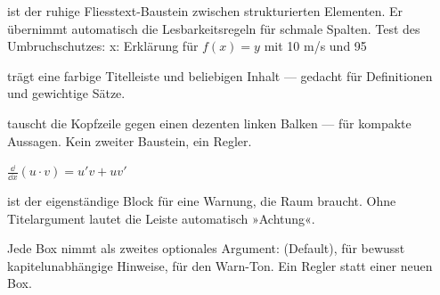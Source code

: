 \ZSFNewColumn
{}


\begin{runintext}
   ist der ruhige Fliesstext-Baustein zwischen
  strukturierten Elementen. Er übernimmt automatisch die Lesbarkeitsregeln
  für schmale Spalten.
  Test des Umbruchschutzes: x: Erklärung für $f(x) = y$ mit 10 m/s und 95 %
\end{runintext}

\begin{defbox}
   trägt eine farbige Titelleiste und beliebigen Inhalt —
  gedacht für Definitionen und gewichtige Sätze.
\end{defbox}

\begin{defbox}[Dieselbe Box, leiser\ZSFTitleTag{weight=quiet}][weight=quiet]
   tauscht die Kopfzeile gegen einen dezenten linken
  Balken — für kompakte Aussagen. Kein zweiter Baustein, ein Regler.
\end{defbox}

\begin{formulabox}[Dritte Stufe: Titel über der Box\ZSFTitleTag{weight=caption}][weight=caption]
  $\displaystyle \frac{\dd}{\dd x}\left(u\cdot v\right) = u'v + uv'$
\end{formulabox}

\begin{warnbox}
   ist der eigenständige Block für eine Warnung, die
  Raum braucht. Ohne Titelargument lautet die Leiste automatisch »Achtung«.
\end{warnbox}

\begin{defbox}[Dieselbe Box, anderer Ton\ZSFTitleTag{tone=neutral}][tone=neutral]
  Jede Box nimmt  als zweites optionales Argument:
   (Default),  für bewusst
  kapitelunabhängige Hinweise,  für den Warn-Ton. Ein Regler
  statt einer neuen Box.
\end{defbox}

